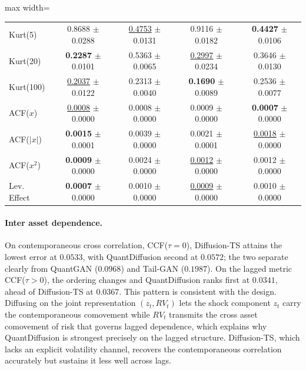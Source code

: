 \documentclass[sigconf,natbib=false]{acmart}
\begin{document}
\begin{table}[htbp]
\begin{adjustbox}{max width=\textwidth}
\begin{tabular}{l|cccc}
Kurt(5)
& 0.8688 $\pm$ 0.0288
& \underline{0.4753} $\pm$ 0.0131
& 0.9116 $\pm$ 0.0182
& \textbf{0.4427} $\pm$ 0.0106 \\
Kurt(20)
& \textbf{0.2287} $\pm$ 0.0101
& 0.5363 $\pm$ 0.0065
& \underline{0.2997} $\pm$ 0.0234
& 0.3646 $\pm$ 0.0130 \\
Kurt(100)
& \underline{0.2037} $\pm$ 0.0122
& 0.2313 $\pm$ 0.0040
& \textbf{0.1690} $\pm$ 0.0089
& 0.2536 $\pm$ 0.0077 \\
\midrule
ACF($x$)
& \underline{0.0008} $\pm$ 0.0000
& 0.0008 $\pm$ 0.0000
& 0.0009 $\pm$ 0.0000
& \textbf{0.0007} $\pm$ 0.0000 \\
ACF($|x|$)
& \textbf{0.0015} $\pm$ 0.0001
& 0.0039 $\pm$ 0.0000
& 0.0021 $\pm$ 0.0001
& \underline{0.0018} $\pm$ 0.0000 \\
ACF($x^2$)
& \textbf{0.0009} $\pm$ 0.0000
& 0.0024 $\pm$ 0.0000
& \underline{0.0012} $\pm$ 0.0000
& 0.0012 $\pm$ 0.0000 \\
\midrule
Lev. Effect
& \textbf{0.0007} $\pm$ 0.0000
& 0.0010 $\pm$ 0.0000
& \underline{0.0009} $\pm$ 0.0000
& 0.0010 $\pm$ 0.0000 \\
\bottomrule
\end{tabular}
\end{adjustbox}
\end{table}

\paragraph{Inter asset dependence.}
On contemporaneous cross correlation, CCF($\tau=0$), Diffusion-TS attains the lowest error at $0.0533$, with QuantDiffusion second at $0.0572$; the two separate clearly from QuantGAN ($0.0968$) and Tail-GAN ($0.1987$). On the lagged metric CCF($\tau>0$), the ordering changes and QuantDiffusion ranks first at $0.0341$, ahead of Diffusion-TS at $0.0367$. This pattern is consistent with the design. Diffusing on the joint representation $(z_t, RV_t)$ lets the shock component $z_t$ carry the contemporaneous comovement while $RV_t$ transmits the cross asset comovement of risk that governs lagged dependence, which explains why QuantDiffusion is strongest precisely on the lagged structure. Diffusion-TS, which lacks an explicit volatility channel, recovers the contemporaneous correlation accurately but sustains it less well across lags.
\end{document}
